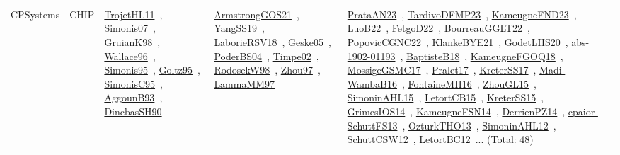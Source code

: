 {\begin{longtable}{lp{3cm}>{\raggedright\arraybackslash}p{6cm}>{\raggedright\arraybackslash}p{6cm}>{\raggedright\arraybackslash}p{8cm}}
CPSystems & CHIP & \href{articles/TrojetHL11.pdf}{TrojetHL11}~\cite{TrojetHL11}, \href{articles/Simonis07.pdf}{Simonis07}~\cite{Simonis07}, \href{papers/GruianK98.pdf}{GruianK98}~\cite{GruianK98}, \href{articles/Wallace96.pdf}{Wallace96}~\cite{Wallace96}, \href{papers/Simonis95.pdf}{Simonis95}~\cite{Simonis95}, \href{papers/Goltz95.pdf}{Goltz95}~\cite{Goltz95}, \href{papers/SimonisC95.pdf}{SimonisC95}~\cite{SimonisC95}, \href{articles/AggounB93.pdf}{AggounB93}~\cite{AggounB93}, \href{articles/DincbasSH90.pdf}{DincbasSH90}~\cite{DincbasSH90} & \href{papers/ArmstrongGOS21.pdf}{ArmstrongGOS21}~\cite{ArmstrongGOS21}, \href{papers/YangSS19.pdf}{YangSS19}~\cite{YangSS19}, \href{articles/LaborieRSV18.pdf}{LaborieRSV18}~\cite{LaborieRSV18}, \href{papers/Geske05.pdf}{Geske05}~\cite{Geske05}, \href{articles/PoderBS04.pdf}{PoderBS04}~\cite{PoderBS04}, \href{articles/Timpe02.pdf}{Timpe02}~\cite{Timpe02}, \href{papers/RodosekW98.pdf}{RodosekW98}~\cite{RodosekW98}, \href{articles/Zhou97.pdf}{Zhou97}~\cite{Zhou97}, \href{articles/LammaMM97.pdf}{LammaMM97}~\cite{LammaMM97} & \href{articles/PrataAN23.pdf}{PrataAN23}~\cite{PrataAN23}, \href{papers/TardivoDFMP23.pdf}{TardivoDFMP23}~\cite{TardivoDFMP23}, \href{papers/KameugneFND23.pdf}{KameugneFND23}~\cite{KameugneFND23}, \href{papers/LuoB22.pdf}{LuoB22}~\cite{LuoB22}, \href{articles/FetgoD22.pdf}{FetgoD22}~\cite{FetgoD22}, \href{articles/BourreauGGLT22.pdf}{BourreauGGLT22}~\cite{BourreauGGLT22}, \href{papers/PopovicCGNC22.pdf}{PopovicCGNC22}~\cite{PopovicCGNC22}, \href{papers/KlankeBYE21.pdf}{KlankeBYE21}~\cite{KlankeBYE21}, \href{papers/GodetLHS20.pdf}{GodetLHS20}~\cite{GodetLHS20}, \href{articles/abs-1902-01193.pdf}{abs-1902-01193}~\cite{abs-1902-01193}, \href{articles/BaptisteB18.pdf}{BaptisteB18}~\cite{BaptisteB18}, \href{papers/KameugneFGOQ18.pdf}{KameugneFGOQ18}~\cite{KameugneFGOQ18}, \href{papers/MossigeGSMC17.pdf}{MossigeGSMC17}~\cite{MossigeGSMC17}, \href{papers/Pralet17.pdf}{Pralet17}~\cite{Pralet17}, \href{articles/KreterSS17.pdf}{KreterSS17}~\cite{KreterSS17}, \href{papers/Madi-WambaB16.pdf}{Madi-WambaB16}~\cite{Madi-WambaB16}, \href{papers/FontaineMH16.pdf}{FontaineMH16}~\cite{FontaineMH16}, \href{papers/ZhouGL15.pdf}{ZhouGL15}~\cite{ZhouGL15}, \href{articles/SimoninAHL15.pdf}{SimoninAHL15}~\cite{SimoninAHL15}, \href{articles/LetortCB15.pdf}{LetortCB15}~\cite{LetortCB15}, \href{papers/KreterSS15.pdf}{KreterSS15}~\cite{KreterSS15}, \href{articles/GrimesIOS14.pdf}{GrimesIOS14}~\cite{GrimesIOS14}, \href{articles/KameugneFSN14.pdf}{KameugneFSN14}~\cite{KameugneFSN14}, \href{papers/DerrienPZ14.pdf}{DerrienPZ14}~\cite{DerrienPZ14}, \href{papers/cpaior-SchuttFS13.pdf}{cpaior-SchuttFS13}~\cite{cpaior-SchuttFS13}, \href{articles/OzturkTHO13.pdf}{OzturkTHO13}~\cite{OzturkTHO13}, \href{papers/SimoninAHL12.pdf}{SimoninAHL12}~\cite{SimoninAHL12}, \href{papers/SchuttCSW12.pdf}{SchuttCSW12}~\cite{SchuttCSW12}, \href{papers/LetortBC12.pdf}{LetortBC12}~\cite{LetortBC12}... (Total: 48)\\

\end{longtable}}
